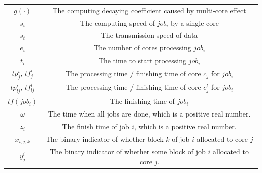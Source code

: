 \documentclass{llncs}
\begin{document}
\begin{appendices}
\begin{table}[htbp]
\begin{center}
\begin{tabular}{c|c}
$g(\cdot)$ &  The computing decaying coefficient caused by multi-core effect\\
$s_i$ & The computing speed of $job_i$ by a single core\\
$s_t$ & The transmission speed of data \\
$e_i$ & The number of cores processing $job_i$\\
$t_i$ & The time to start processing $job_i$\\
$tp^i_j$, $tf^i_{j}$ & The processing time / finishing time of core $c_j$ for $job_i$\\
$tp^i_{lj}$, $tf^i_{lj}$ & The processing time / finishing time of core $c^l_j$ for $job_i$\\
$tf(job_i)$ & The finishing time of $job_i$ \\
$\omega$ & The time when all jobs are done, which is a positive real number.\\
$z_i$ & The finish time of job $i$, which is a positive real number.\\
$x_{i,j,k}$ & The binary indicator of whether block $k$ of job $i$ allocated to core $j$\\
$y^i_j$ & The binary indicator of whether some block of job $i$ allocated to core $j$.\\
\bottomrule
\end{tabular}
\label{tabSYMBOLS}
\end{center}
\end{table}




\end{appendices}





\end{document}

